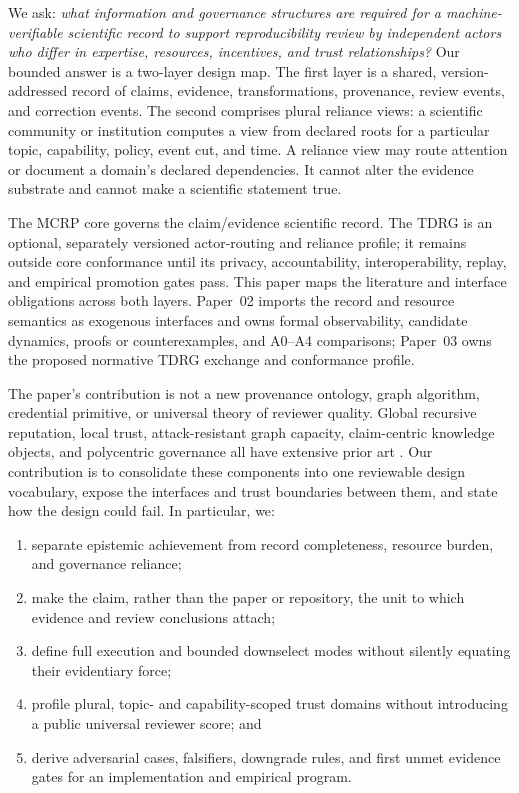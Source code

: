 \documentclass[11pt]{article}
\newcommand{\mcrp}{MCRP}
\newcommand{\tdrg}{TDRG}
\begin{document}
We ask: \emph{what information and governance structures are required for a machine-verifiable scientific record to support reproducibility review by independent actors who differ in expertise, resources, incentives, and trust relationships?} Our bounded answer is a two-layer design map. The first layer is a shared, version-addressed record of claims, evidence, transformations, provenance, review events, and correction events. The second comprises plural reliance views: a scientific community or institution computes a view from declared roots for a particular topic, capability, policy, event cut, and time. A reliance view may route attention or document a domain's declared dependencies. It cannot alter the evidence substrate and cannot make a scientific statement true.

The \mcrp{} core governs the claim/evidence scientific record. The \tdrg{} is an optional, separately versioned actor-routing and reliance profile; it remains outside core conformance until its privacy, accountability, interoperability, replay, and empirical promotion gates pass. This paper maps the literature and interface obligations across both layers. Paper~02 imports the record and resource semantics as exogenous interfaces and owns formal observability, candidate dynamics, proofs or counterexamples, and A0--A4 comparisons; Paper~03 owns the proposed normative \tdrg{} exchange and conformance profile.

The paper's contribution is not a new provenance ontology, graph algorithm, credential primitive, or universal theory of reviewer quality. Global recursive reputation, local trust, attack-resistant graph capacity, claim-centric knowledge objects, and polycentric governance all have extensive prior art \citep{kamvar-eigentrust-2003,massa-localtrust-2005,levien-aiken-1998,micropublications-2014,ostrom-polycentric-2010}. Our contribution is to consolidate these components into one reviewable design vocabulary, expose the interfaces and trust boundaries between them, and state how the design could fail. In particular, we:

\begin{enumerate}
  \item separate epistemic achievement from record completeness, resource burden, and governance reliance;
  \item make the claim, rather than the paper or repository, the unit to which evidence and review conclusions attach;
  \item define full execution and bounded downselect modes without silently equating their evidentiary force;
  \item profile plural, topic- and capability-scoped trust domains without introducing a public universal reviewer score; and
  \item derive adversarial cases, falsifiers, downgrade rules, and first unmet evidence gates for an implementation and empirical program.
\end{enumerate}
\end{document}
